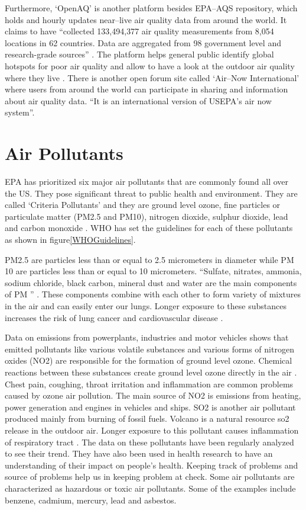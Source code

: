 \documentclass[sigconf]{acmart}
\begin{document}
Furthermore, `OpenAQ' is another platform besides EPA--AQS repository, which holds and hourly updates near--live air quality data from around the world. It claims to have ``collected 133,494,377 air quality measurements from 8,054 locations in 62 countries. Data are aggregated from 98 government level and research-grade sources'' \cite{googlecloud}. The platform helps general public identify global hotspots for poor air quality and allow to have a look at the outdoor air quality where they live \cite{googlecloud}. There is another open forum site called `Air--Now International' where users from around the world can participate in sharing and information about air quality data. ``It is an international version of USEPA's air now system''\cite{air-quality}. 


\section{Air Pollutants}
EPA has prioritized six major air pollutants that are commonly found all over the US. They pose significant threat to public health and environment.  They are called `Criteria Pollutants' and they are ground level ozone, fine particles or particulate matter (PM2.5 and PM10), nitrogen dioxide, sulphur dioxide, lead and carbon monoxide \cite{epa-gov}. WHO has set the guidelines for each of these pollutants as shown in figure\ref{WHOGuidelines}.

PM2.5 are particles less than or equal to 2.5 micrometers in diameter while PM 10 are particles less than or equal to 10 micrometers. ``Sulfate, nitrates, ammonia, sodium chloride, black carbon, mineral dust and water are the main components of PM '' \cite{www-who}. These components combine with each other to form variety of mixtures in the air and can easily enter our lungs. Longer exposure to these substances increases the risk of lung cancer and cardiovascular disease \cite{www-who}. 

Data on emissions from powerplants, industries and motor vehicles shows that emitted pollutants like various volatile substances and various forms of nitrogen oxides (NO2) are responsible for the formation of ground level ozone. Chemical reactions between these substances create ground level ozone directly in the air \cite{epa-gov}. Chest pain, coughing, throat irritation and inflammation are common problems caused by ozone air pollution. The main source of NO2 is emissions from heating, power generation and engines in vehicles and ships. SO2 is another air pollutant produced mainly from burning of fossil fuels. Volcano is a natural resource so2 release  in the outdoor air. Longer exposure to this pollutant causes inflammation of respiratory tract \cite{www-who}. The data on these pollutants have been regularly analyzed to see their trend. They have also been used in health research to have an understanding of their impact on people's health. Keeping track of problems and source of problems help us in keeping problem at check. Some air pollutants are characterized as hazardous or toxic air pollutants. Some of the examples include benzene, cadmium, mercury, lead and asbestos. 
\end{document}
